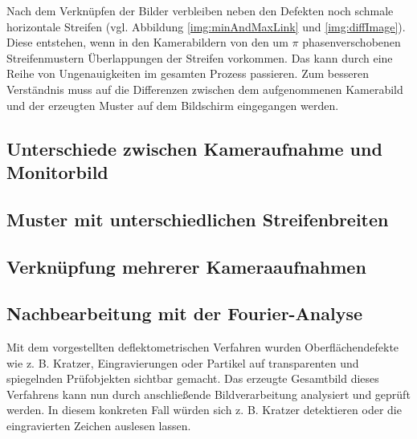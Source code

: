 Nach dem Verknüpfen der Bilder verbleiben neben den Defekten noch schmale horizontale Streifen (vgl. Abbildung \ref{img:minAndMaxLink} und \ref{img:diffImage}).
Diese entstehen, wenn in den Kamerabildern von den um $\pi$ phasenverschobenen Streifenmustern Überlappungen der Streifen vorkommen.
Das kann durch eine Reihe von Ungenauigkeiten im gesamten Prozess passieren.
Zum besseren Verständnis muss auf die Differenzen zwischen dem aufgenommenen Kamerabild und der erzeugten Muster auf dem Bildschirm eingegangen werden.

{
	\FloatBarrier
    \subsection{Unterschiede zwischen Kameraufnahme und Monitorbild}
    \label{sub:unterschiedeKameraUndMonitor}
    
}

{
	\FloatBarrier
    \subsection{Muster mit unterschiedlichen Streifenbreiten}
    \label{sub:musterUnterschiedlichenStreifenbreiten}
    
}

{
	\FloatBarrier
    \subsection{Verknüpfung mehrerer Kameraaufnahmen}
    \label{sub:verknuepfungMehrererKameraaufnahmen}
    
}

{
	\FloatBarrier
    \subsection{Nachbearbeitung mit der Fourier-Analyse}
    \label{sub:nachbearbeitungFourierAnalyse}
    
}

\noindent
Mit dem vorgestellten deflektometrischen Verfahren wurden Oberflächendefekte wie z. B. Kratzer, Eingravierungen oder Partikel auf transparenten und spiegelnden Prüfobjekten sichtbar gemacht.
Das erzeugte Gesamtbild dieses Verfahrens kann nun durch anschließende Bildverarbeitung analysiert und geprüft werden.
In diesem konkreten Fall würden sich z. B. Kratzer detektieren oder die eingravierten Zeichen auslesen lassen.

